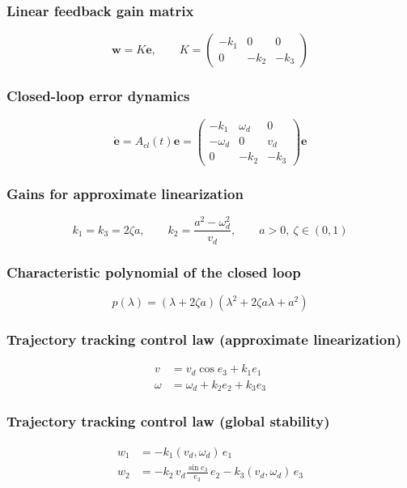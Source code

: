 \subsubsection{Linear feedback gain matrix}
\begin{equation*}
    \mathbf w=K\mathbf e,\qquad K=\begin{pmatrix}-k_1&0&0\\0&-k_2&-k_3\end{pmatrix}
\end{equation*}

\subsubsection{Closed-loop error dynamics}
\begin{equation*}
    \dot{\mathbf e}=A_{cl}(t)\mathbf e=\begin{pmatrix}-k_1&\omega_d&0\\-\omega_d&0&v_d\\0&-k_2&-k_3\end{pmatrix}\mathbf e
\end{equation*}

\subsubsection{Gains for approximate linearization}
\begin{equation*}
    k_1=k_3=2\zeta a,\qquad k_2=\frac{a^2-\omega_d^2}{v_d},\qquad a>0,\ \zeta\in(0,1)
\end{equation*}

\subsubsection{Characteristic polynomial of the closed loop}
\begin{equation*}
    p(\lambda)=(\lambda+2\zeta a)(\lambda^2+2\zeta a\lambda+a^2)
\end{equation*}

\subsubsection{Trajectory tracking control law (approximate linearization)}
\begin{align*}
    v&=v_d\cos e_3+k_1e_1\\
    \omega&=\omega_d+k_2e_2+k_3e_3
\end{align*}

\subsubsection{Trajectory tracking control law (global stability)}
\begin{align*}
    w_1&=-k_1(v_d,\omega_d)\,e_1\\
    w_2&=-k_2\,v_d\frac{\sin e_3}{e_3}\,e_2-k_3(v_d,\omega_d)\,e_3
\end{align*}

